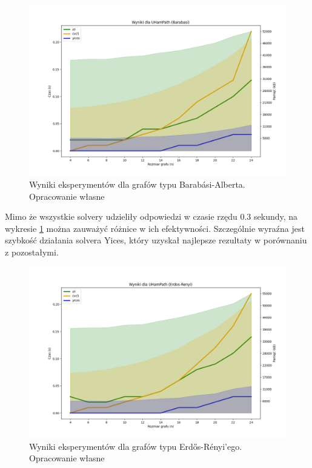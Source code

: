 \begin{figure}[htbp]
	\centering
	\begin{minipage}{\textwidth}
		\includegraphics[width=\textwidth]{./figures/2-barabasi-plot.png}
		\caption{Wyniki eksperymentów dla grafów typu Barabási-Alberta. Opracowanie własne}
		\label{fig:2-barabasi-plot}
	\end{minipage}
\end{figure}

Mimo że wszystkie solvery udzieliły odpowiedzi w czasie rzędu 0.3 sekundy, na wykresie \ref{fig:2-barabasi-plot} można zauważyć różnice w ich efektywności. Szczególnie wyraźna jest szybkość działania solvera Yices, który uzyskał najlepsze rezultaty w porównaniu z pozostałymi.

\begin{figure}[htbp]
	\centering
	\begin{minipage}{\textwidth}
		\includegraphics[width=\textwidth]{./figures/2-erdos-renyi-plot.png}
		\caption{Wyniki eksperymentów dla grafów typu Erdős-Rényi'ego. Opracowanie własne}
		\label{fig:2-erdos-renyi-plot}
	\end{minipage}
\end{figure}


